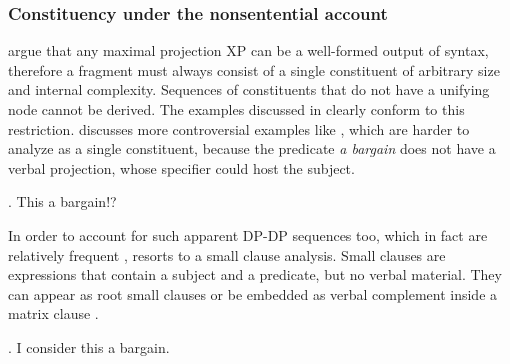 \subsubsection{Constituency under the nonsentential account}
\citet{barton.progovac2005} argue that any maximal projection XP can be a well-formed output of syntax, therefore a fragment must always consist of a single constituent of arbitrary size and internal complexity. Sequences of constituents that do not have a unifying node cannot be derived. The examples discussed in \citet{barton.progovac2005} clearly conform to this restriction. \citet{progovac2006} discusses more controversial examples like \Next, which are harder to analyze as a single constituent, because the predicate \textit{a bargain} does not have a verbal projection, whose specifier could host the subject.

\ex. This a bargain!? \hfill \citep[28]{progovac2006} \label{ex:progovac.sc-bargain-root}

In order to account for such apparent DP-DP sequences too, which in fact are relatively frequent \citep{reich2017}, \citet{progovac2006} resorts to a small clause analysis. Small clauses \citep{williams1975, stowell1981} are expressions that contain a subject and a predicate, but no verbal material. They can appear as root small clauses \Last or be embedded as verbal complement inside a matrix clause \Next.\largerpage

\ex. I consider this a bargain. \hfill \citep[41]{progovac2006} \label{ex:progovac.sc-bargain-embedded}

